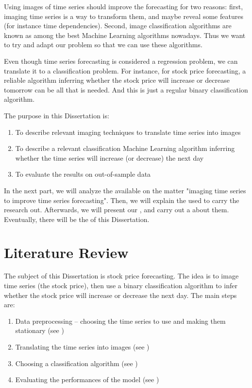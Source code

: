 \documentclass[11pt]{article}
\begin{document}
\begin{onehalfspace}
Using images of time series should improve the forecasting for two reasons: first, imaging time series is a way to transform them, and maybe reveal some features (for instance time dependencies). Second, image classification algorithms are known as among the best Machine Learning algorithms nowadays. Thus we want to try and adapt our problem so that we can use these algorithms.

Even though time series forecasting is considered a regression problem, we can translate it to a classification problem. For instance, for stock price forecasting, a reliable algorithm inferring whether the stock price will increase or decrease tomorrow can be all that is needed. And this is just a regular binary classification algorithm. 

The purpose in this Dissertation is:

\begin{enumerate}
    \item To describe relevant imaging techniques to translate time series into images
    \item To describe a relevant classification Machine Learning algorithm inferring whether the time series will increase (or decrease) the next day
    \item To evaluate the results on out-of-sample data
\end{enumerate}

In the next part, we will analyze the  available on the matter "imaging time series to improve time series forecasting". Then, we will explain the  used to carry the research out. Afterwards, we will present our , and carry out a  about them. Eventually, there will be the  of this Dissertation.

\pagebreak

\section{Literature Review}

\label{sect_littrev}

The subject of this Dissertation is stock price forecasting. The idea is to image time series (the stock price), then use a binary classification algorithm to infer whether the stock price will increase or decrease the next day. The main steps are:

\begin{enumerate}
    \item Data preprocessing -- choosing the time series to use and making them stationary (see )
    \item Translating the time series into images (see )
    \item Choosing a classification algorithm (see )
    \item Evaluating the performances of the model (see )
\end{enumerate}


\end{onehalfspace}
\end{document}
